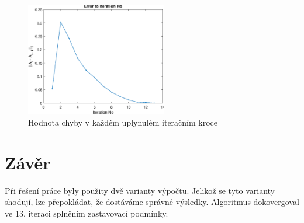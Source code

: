 \begin{figure}[htb]
    \centering
    \includegraphics[width=0.55\textwidth]{graphs/fig4.eps}
    \caption{Hodnota chyby v každém uplynulém iteračním kroce}
    \label{fig:result4}
\end{figure}
\FloatBarrier

\section{Závěr}

Při řešení práce byly použity dvě varianty výpočtu.
Jelikož se tyto varianty shodují, lze přepokládat, že dostáváme správné výsledky.
Algoritmus dokovergoval ve 13. iteraci splněním zastavovací podmínky.
